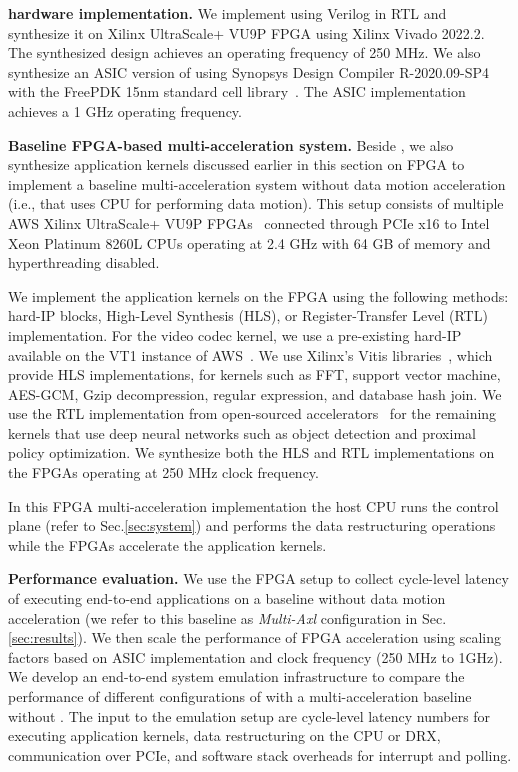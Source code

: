 \noindent \textbf{\drx hardware implementation.}
%
We implement \drx using Verilog in RTL and synthesize it on Xilinx UltraScale+ VU9P FPGA using Xilinx Vivado 2022.2. The synthesized design achieves an operating frequency of 250 MHz. We also synthesize an ASIC version of \drx using Synopsys Design Compiler R-2020.09-SP4 with the FreePDK 15nm standard cell library~\cite{freepdk:mse:2007}. The ASIC implementation achieves a 1 GHz operating frequency.
% 

\noindent \textbf{Baseline FPGA-based multi-acceleration system.}
Beside \drx, we also synthesize application kernels discussed earlier in this section on FPGA to implement a baseline multi-acceleration system without data motion acceleration (i.e., that uses CPU for performing data motion). This setup consists of multiple AWS Xilinx UltraScale+ VU9P FPGAs~\cite{amazon_ec2_f1} connected through PCIe x16 to Intel Xeon Platinum 8260L CPUs operating at 2.4 GHz with 64 GB of memory and hyperthreading disabled.
% 

We implement the application kernels on the FPGA using the following methods: hard-IP blocks, High-Level Synthesis (HLS), or Register-Transfer Level (RTL) implementation. For the video codec kernel, we use a pre-existing hard-IP available on the VT1 instance of AWS~\cite{aws-vt1-instance}. We use Xilinx’s Vitis libraries~\cite{xilinx-vitis-libraries}, which provide HLS implementations, for kernels such as FFT, support vector machine, AES-GCM, Gzip decompression, regular expression, and database hash join. We use the RTL implementation from open-sourced accelerators~\cite{dnnweaver:micro:2016} for the remaining kernels that use deep neural networks such as object detection and proximal policy optimization. We synthesize both the HLS and RTL implementations on the FPGAs operating at 250 MHz clock frequency.

In this FPGA multi-acceleration implementation the host CPU runs the control plane (refer to Sec.\ref{sec:system}) and performs the data restructuring operations while the FPGAs accelerate the application kernels.

\noindent \textbf{Performance evaluation.}
We use the FPGA setup to collect cycle-level latency of executing end-to-end applications on a baseline without data motion acceleration (we refer to this baseline as \textit{Multi-Axl} configuration in Sec.\ref{sec:results}). We then scale the performance of FPGA acceleration using scaling factors based on ASIC implementation and clock frequency (250 MHz to 1GHz).
%
We develop an end-to-end system emulation infrastructure to compare the performance of different configurations of \dmx with a multi-acceleration baseline without \dmx. The input to the emulation setup are cycle-level latency numbers for executing application kernels, data restructuring on the CPU or DRX, communication over PCIe, and software stack overheads for interrupt and polling. 


